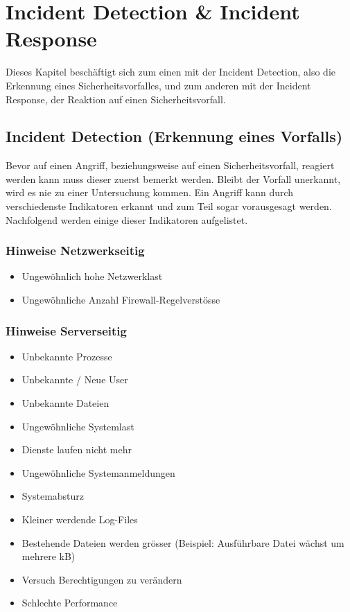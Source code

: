 \chapter{Incident Detection \& Incident Response} \label{chap:IDIR}
Dieses Kapitel beschäftigt sich zum einen mit der Incident Detection, also die Erkennung eines Sicherheitsvorfalles, und zum anderen mit der Incident Response, der Reaktion auf einen Sicherheitsvorfall.

\section{Incident Detection (Erkennung eines Vorfalls)} \label{sec:IncidentDetection}
Bevor auf einen Angriff, beziehungsweise auf einen Sicherheitsvorfall, reagiert werden kann muss dieser zuerst bemerkt werden. Bleibt der Vorfall unerkannt, wird es nie zu einer Untersuchung kommen.
Ein Angriff kann durch verschiedenste Indikatoren erkannt und zum Teil sogar vorausgesagt werden. Nachfolgend werden einige dieser Indikatoren aufgelistet.

\subsection{Hinweise Netzwerkseitig}
\begin{itemize}
  \item Ungewöhnlich hohe Netzwerklast
  \item Ungewöhnliche Anzahl Firewall-Regelverstösse
\end{itemize}

\subsection{Hinweise Serverseitig}
\begin{itemize}
  \item Unbekannte Prozesse
  \item Unbekannte / Neue User
  \item Unbekannte Dateien
  \item Ungewöhnliche Systemlast
  \item Dienste laufen nicht mehr
  \item Ungewöhnliche Systemanmeldungen
  \item Systemabsturz
  \item Kleiner werdende Log-Files
  \item Bestehende Dateien werden grösser (Beispiel: Ausführbare Datei wächst um mehrere kB)
  \item Versuch Berechtigungen zu verändern
  \item Schlechte Performance
\end{itemize}

